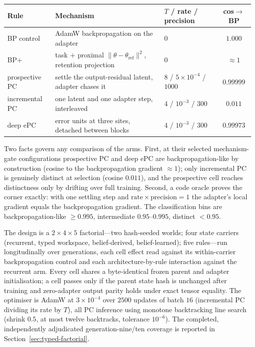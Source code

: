 \documentclass[11pt]{article}
\begin{document}
\begin{center}\small
\begin{tabular}{@{}lllc@{}}
\toprule
Rule & Mechanism & $T$ / rate / precision & cos$\to$BP \\
\midrule
BP control & AdamW backpropagation on the adapter & $0$ & $1.000$ \\
BP$+$ & task $+$ proximal $\|\theta-\theta_{\mathrm{ref}}\|^2$, retention projection & $0$ & ${\approx}1$ \\
prospective PC & settle the output-residual latent, adapter chases it & $8$ / $5\!\times\!10^{-4}$ / $1000$ & $0.99999$ \\
incremental PC & one latent and one adapter step, interleaved & $4$ / $10^{-3}$ / $300$ & $0.011$ \\
deep ePC & error units at three sites, detached between blocks & $4$ / $10^{-3}$ / $300$ & $0.99973$ \\
\bottomrule
\end{tabular}
\end{center}

Two facts govern any comparison of the arms. First, at their selected mechanism-gate
configurations prospective PC and deep ePC are backpropagation-like by construction (cosine to
the backpropagation gradient ${\approx}1$); only incremental PC is genuinely distinct at
selection (cosine $0.011$), and the prospective cell reaches distinctness only by drifting over
full training. Second, a code oracle proves the corner exactly: with one settling step and
$\text{rate}\times\text{precision}=1$ the adapter's local gradient equals the backpropagation
gradient. The classification bins are backpropagation-like $\ge 0.995$, intermediate
$0.95$--$0.995$, distinct $<0.95$.

The design is a $2\times4\times5$ factorial---two hash-seeded worlds; four state carriers
(recurrent, typed workspace, belief-derived, belief-learned); five rules---run longitudinally
over generations, each cell effect read against its within-carrier backpropagation control and
each architecture-by-rule interaction against the recurrent arm. Every cell shares a
byte-identical frozen parent and adapter initialisation; a cell passes only if the parent
state hash is unchanged after training and zero-adapter output parity holds under exact tensor
equality. The optimiser is AdamW at $3\times10^{-4}$ over $2500$ updates of batch $16$
(incremental PC dividing its rate by $T$), all PC inference using monotone backtracking line
search (shrink $0.5$, at most twelve backtracks, tolerance $10^{-6}$). The completed,
independently adjudicated generation-nine/ten coverage is reported in
Section~\ref{sec:typed-factorial}.
\end{document}
